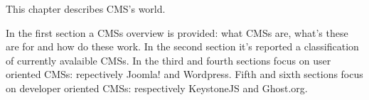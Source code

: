This chapter describes CMS's world.

In the first section a CMSs overview is provided: what CMSs are, what's these are for and how do these work. In the second section it's reported a classification of currently avalaible CMSs. In the third and fourth sections focus on user oriented CMSs: repectively Joomla! and Wordpress. Fifth and sixth sections focus on developer oriented CMSs: respectively KeystoneJS and Ghost.org.